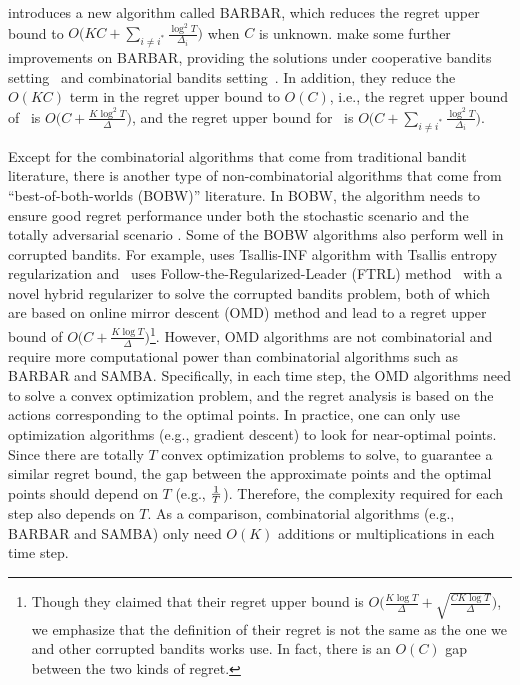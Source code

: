 \citet{gupta2019better} introduces a new algorithm called 
BARBAR, which reduces the regret upper bound to $O\big(KC+\sum_{i\neq i^*}\frac{\log^2 T}{\Delta_i}\big)$ when $C$ is unknown. 
%
\citet{liu2021cooperative,xu2021simple} make some further improvements on BARBAR, providing the solutions under cooperative bandits setting~\cite{liu2021cooperative} and combinatorial bandits setting~\cite{xu2021simple}. In addition, they reduce the $O(KC)$ term in the regret upper bound to $O(C)$, i.e.,  the regret upper bound of~\citet{liu2021cooperative} is $O\big(C+\frac{K\log^2 T}{\Delta}\big)$, and the regret upper bound for~\citet{xu2021simple} is $O\big(C+\sum_{i\neq i^*}\frac{\log^2 T}{\Delta_{i}}\big)$.




Except for the combinatorial algorithms that come from traditional bandit literature, there is another type of non-combinatorial algorithms that come from ``best-of-both-worlds (BOBW)'' literature. In BOBW, the algorithm needs to ensure good regret performance under both the stochastic scenario %
and the totally adversarial scenario 
\cite{bubeck2012best}. Some of the BOBW algorithms also perform well in corrupted bandits. For example, 
%
\citet{zimmert2021tsallis} uses Tsallis-INF algorithm with Tsallis entropy regularization and~\citet{jin2020simultaneously} uses Follow-the-Regularized-Leader (FTRL) method~\cite{audibert2009minimax,zimin2013online,zimmert2019connections} with a novel hybrid regularizer to solve the corrupted bandits problem, both of which are based on online mirror descent (OMD) method and lead to a regret upper bound of $O\big(C+\frac{K\log T}{\Delta}\big)$\footnote{Though they claimed that their regret upper bound is $O\big(\frac{K\log T}{\Delta}+\sqrt{\frac{CK\log T}{\Delta}}\big)$, we emphasize that the definition of their regret is not the same as the one we and other corrupted bandits works use. In fact, there is an $O(C)$ gap between the two kinds of regret.}. 
However, OMD algorithms are not combinatorial and require more computational power than combinatorial algorithms such as BARBAR and SAMBA. 
Specifically, in each time step, the OMD algorithms need to solve a convex optimization problem, and the regret analysis is based on the actions corresponding to the optimal points. 
%
In practice, one can only use optimization algorithms (e.g., gradient descent) to look for near-optimal points. 
%
Since there are totally $T$ convex optimization problems to solve, to guarantee a similar regret bound, the gap between the approximate points and the optimal points should depend on $T$ (e.g., ${1\over T}$).
%
Therefore, the complexity required for each step also depends on $T$. 
%
As a comparison, combinatorial algorithms (e.g., BARBAR and SAMBA) only need $O(K)$ additions or multiplications in each time step. 



